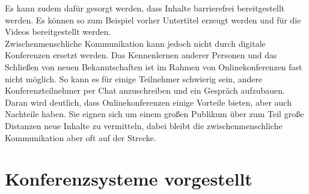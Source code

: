 Es kann zudem dafür gesorgt werden, dass Inhalte barrierefrei bereitgestellt werden.
Es können so zum Beispiel vorher Untertitel erzeugt werden und für die Videos bereitgestellt werden.
\autocite[Vgl.][]{M_Sladek.2020}
\\
Zwischenmenschliche Kommunikation kann jedoch nicht durch digitale Konferenzen ersetzt werden.
Das Kennenlernen anderer Personen und das Schließen von neuen Bekanntschaften ist im Rahmen von Onlinekonferenzen fast nicht möglich.
So kann es für einige Teilnehmer schwierig sein, andere Konferenzteilnehmer per Chat anzuschreiben und ein Gespräch aufzubauen.
\autocite[Vgl.][]{M_Sladek.2020}
\\
Daran wird deutlich, dass Onlinekonferenzen einige Vorteile bieten, aber auch Nachteile haben.
Sie eignen sich um einem großen Publikum über zum Teil große Distanzen neue Inhalte zu vermitteln, dabei bleibt die zwischenmenschliche Kommunikation aber oft auf der Strecke.

\section{Konferenzsysteme vorgestellt}
\label{sec:konferenzsysteme_vorgestellt}
